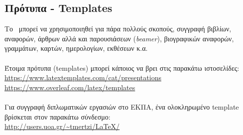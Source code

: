 \documentclass[a4paper, 12pt, oneside, xelatex, final]{article}
\begin{document}
	\subsection{Πρότυπα - Templates}
	\noindent Το \XeLaTeX\ μπορεί να χρησιμοποιηθεί για πάρα πολλούς σκοπούς, συγγραφή βιβλίων, αναφορών, άρθρων αλλά και παρουσιάσεων (\emph{beamer}), βιογραφικών αναφορών, γραμμάτων, καρτών, ημερολογίων, εκθέσεων κ.α.\\ \\
	Έτοιμα πρότυπα (templates) μπορεί κάποιος να βρει στις παρακάτω ιστοσελίδες:\\
	\url{https://www.latextemplates.com/cat/presentations}\\
	\url{https://www.overleaf.com/latex/templates}\\ \\
	Για συγγραφή διπλωματικών εργασιών στο ΕΚΠΑ, ένα ολοκληρωμένο template βρίσκεται στον παρακάτω σύνδεσμο:\\
	\url{http://users.uoa.gr/~tmertzi/LaTeX/}

	
\end{document}
